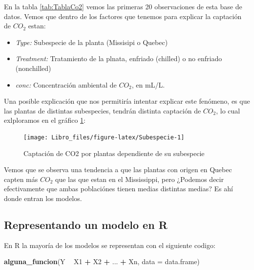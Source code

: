 \documentclass[]{book}
\newenvironment{Shaded}{\begin{snugshade}}{\end{snugshade}}
\newcommand{\DataTypeTok}[1]{\textcolor[rgb]{0.13,0.29,0.53}{#1}}
\newcommand{\KeywordTok}[1]{\textcolor[rgb]{0.13,0.29,0.53}{\textbf{#1}}}
\newcommand{\NormalTok}[1]{#1}
\newcommand{\OperatorTok}[1]{\textcolor[rgb]{0.81,0.36,0.00}{\textbf{#1}}}
\newcommand{\StringTok}[1]{\textcolor[rgb]{0.31,0.60,0.02}{#1}}
\providecommand{\tightlist}{%
  \setlength{\itemsep}{0pt}\setlength{\parskip}{0pt}}
\begin{document}
En la tabla \ref{tab:TablaCo2} vemos las primeras 20 observaciones de
esta base de datos. Vemos que dentro de los factores que tenemos para
explicar la captación de \(CO_2\) estan:

\begin{itemize}
\tightlist
\item
  \emph{Type:} Subespecie de la planta (Missisipi o Quebec)
\item
  \emph{Treatment:} Tratamiento de la plnata, enfriado (chilled) o no
  enfriado (nonchilled)
\item
  \emph{conc:} Concentración ambiental de \(CO_2\), en mL/L.
\end{itemize}

Una posible explicación que nos permitiría intentar explicar este
fenómeno, es que las plantas de distintas subespecies, tendrán distinta
captación de \(CO_2\), lo cual exlploramos en el gráfico
\ref{fig:Subespecie}:

\begin{figure}

{\centering \texttt{[image: Libro\_files/figure-latex/Subespecie-1]} 

}

\caption{Captación de CO2 por plantas dependiente de su subespecie}\label{fig:Subespecie}
\end{figure}

Vemos que se observa una tendencia a que las plantas con origen en
Quebec capten más \(CO_2\) que las que estan en el Mississippi, pero
¿Podemos decir efectivamente que ambas poblaciónes tienen medias
distintas medias? Es ahí donde entran los modelos.

\hypertarget{representando-un-modelo-en-r}{%
\subsection{Representando un modelo en
R}\label{representando-un-modelo-en-r}}

En R la mayoría de los modelos se representan con el siguiente codigo:

\begin{Shaded}
\begin{Highlighting}[]
\KeywordTok{alguna_funcion}\NormalTok{(Y }\OperatorTok{~}\StringTok{ }\NormalTok{X1 }\OperatorTok{+}\StringTok{ }\NormalTok{X2 }\OperatorTok{+}\StringTok{ }\NormalTok{... }\OperatorTok{+}\StringTok{ }\NormalTok{Xn, }\DataTypeTok{data =}\NormalTok{ data.frame)}
\end{Highlighting}
\end{Shaded}
\end{document}
